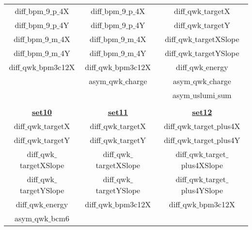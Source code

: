 \begin{singlespace}
\begin{table}[!h]
\begin{tabular}{ c  c  c }
    diff$\_$bpm$\_$9$\_$p$\_$4X & diff$\_$bpm$\_$9$\_$p$\_$4X & diff$\_$qwk$\_$targetX \\
    diff$\_$bpm$\_$9$\_$p$\_$4Y & diff$\_$bpm$\_$9$\_$p$\_$4Y & diff$\_$qwk$\_$targetY \\
    diff$\_$bpm$\_$9$\_$m$\_$4X & diff$\_$bpm$\_$9$\_$m$\_$4X & diff$\_$qwk$\_$targetXSlope \\
    diff$\_$bpm$\_$9$\_$m$\_$4Y & diff$\_$bpm$\_$9$\_$m$\_$4Y & diff$\_$qwk$\_$targetYSlope \\
    diff$\_$qwk$\_$bpm3c12X & diff$\_$qwk$\_$bpm3c12X & diff$\_$qwk$\_$energy \\
    & asym$\_$qwk$\_$charge & asym$\_$qwk$\_$charge \\
	& & asym$\_$uslumi$\_$sum\\
	\\
    \textbf{\underline{set10}} & \textbf{\underline{set11}} 		& \textbf{\underline{set12}} \\ %
    diff$\_$qwk$\_$targetX 		& diff$\_$qwk$\_$targetX 		& diff$\_$qwk$\_$target$\_$plus4X \\
    diff$\_$qwk$\_$targetY 		& diff$\_$qwk$\_$targetY 		& diff$\_$qwk$\_$target$\_$plus4Y \\
    diff$\_$qwk$\_$targetXSlope 	& diff$\_$qwk$\_$targetXSlope 	& diff$\_$qwk$\_$target$\_$plus4XSlope \\
    diff$\_$qwk$\_$targetYSlope 	& diff$\_$qwk$\_$targetYSlope 	& diff$\_$qwk$\_$target$\_$plus4YSlope \\
    diff$\_$qwk$\_$energy 		& diff$\_$qwk$\_$bpm3c12X 		& diff$\_$qwk$\_$bpm3c12X \\
    asym$\_$qwk$\_$bcm6 			& 						 		&  \\

        
  	\end{tabular}
  \label{regression_table}
\end{table}
\end{singlespace}


